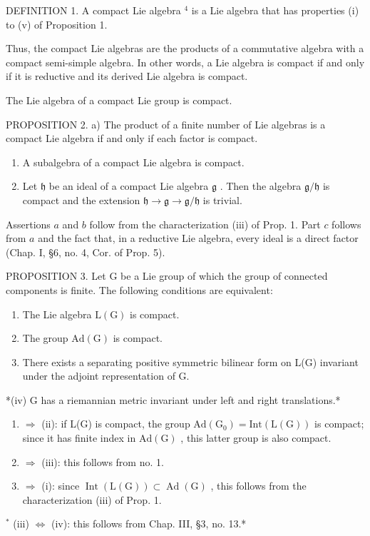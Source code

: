 DEFINITION 1. A compact Lie algebra \(^{4}\) is a Lie algebra that has properties (i) to (v) of Proposition 1.

Thus, the compact Lie algebras are the products of a commutative algebra with a compact semi-simple algebra. In other words, a Lie algebra is compact if and only if it is reductive and its derived Lie algebra is compact.

The Lie algebra of a compact Lie group is compact.

PROPOSITION 2. a) The product of a finite number of Lie algebras is a compact Lie algebra if and only if each factor is compact.

\begin{enumerate}
\def\labelenumi{\alph{enumi})}
\setcounter{enumi}{1}
\item
  A subalgebra of a compact Lie algebra is compact.
\item
  Let \(\mathfrak{h}\) be an ideal of a compact Lie algebra \(\mathfrak{g}\) . Then the algebra \(\mathfrak{g} / \mathfrak{h}\) is compact and the extension \(\mathfrak{h} \to \mathfrak{g} \to \mathfrak{g} / \mathfrak{h}\) is trivial.
\end{enumerate}

Assertions \(a\) and \(b\) follow from the characterization (iii) of Prop. 1. Part \(c\) follows from \(a\) and the fact that, in a reductive Lie algebra, every ideal is a direct factor (Chap. I, §6, no. 4, Cor. of Prop. 5).

PROPOSITION 3. Let G be a Lie group of which the group of connected components is finite. The following conditions are equivalent:

\begin{enumerate}
\def\labelenumi{(\roman{enumi})}
\item
  The Lie algebra \(\mathrm{L}(\mathrm{G})\) is compact.
\item
  The group \(\mathrm{Ad}(\mathrm{G})\) is compact.
\item
  There exists a separating positive symmetric bilinear form on L(G) invariant under the adjoint representation of G.
\end{enumerate}

*(iv) G has a riemannian metric invariant under left and right translations.*

\begin{enumerate}
\def\labelenumi{(\roman{enumi})}
\item
  \(\Longrightarrow\) (ii): if L(G) is compact, the group \(\mathrm{Ad}(\mathrm{G}_{0}) = \mathrm{Int}(\mathrm{L}(\mathrm{G}))\) is compact; since it has finite index in \(\mathrm{Ad}(\mathrm{G})\) , this latter group is also compact.
\item
  \(\Longrightarrow\) (iii): this follows from no. 1.
\item
  \(\Longrightarrow\) (i): since \(\operatorname{Int}(\mathrm{L}(\mathrm{G})) \subset \operatorname{Ad}(\mathrm{G})\) , this follows from the characterization (iii) of Prop. 1.
\end{enumerate}

\(^{*}\) (iii) \(\Longleftrightarrow\) (iv): this follows from Chap. III, §3, no. 13.*

